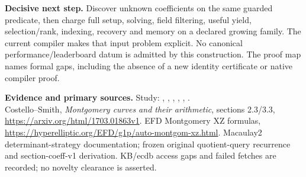 \documentclass[10pt,a4paper]{article}
\begin{document}
\textbf{Decisive next step.}
Discover unknown coefficients on the same guarded predicate, then charge full
setup, solving, field filtering, useful yield, selection/rank, indexing,
recovery and memory on a declared growing family. The current compiler makes
that input problem explicit. No canonical performance/leaderboard datum is
admitted by this construction. The proof map names formal gaps, including the
absence of a new identity certificate or native compiler proof.

{\small\sloppy\textbf{Evidence and primary sources.}
Study: , ,
, ,
, .\\
Costello--Smith, \emph{Montgomery curves and their arithmetic}, sections 2.3/3.3,
\url{https://arxiv.org/html/1703.01863v1}. EFD Montgomery XZ formulas,
\url{https://hyperelliptic.org/EFD/g1p/auto-montgom-xz.html}.
Macaulay2 determinant-strategy documentation; frozen original quotient-query
recurrence and section-coeff-v1 derivation. KB/ecdb access gaps and failed
fetches are recorded; no novelty clearance is asserted.}
\end{document}
